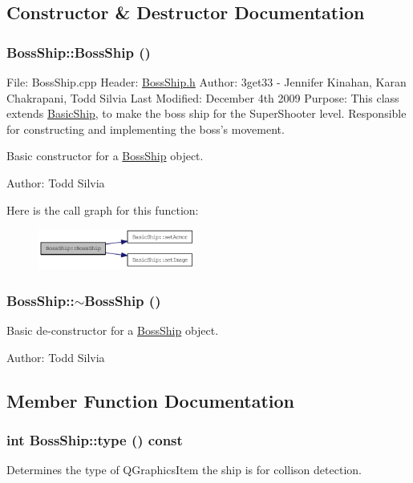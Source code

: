 \subsection{Constructor \& Destructor Documentation}
\hypertarget{class_boss_ship_af7d62c20c5aa3de6435ef0e80351dfb6}{
\subsubsection[{BossShip}]{\setlength{\rightskip}{0pt plus 5cm}BossShip::BossShip ()}}
\label{class_boss_ship_af7d62c20c5aa3de6435ef0e80351dfb6}
File: BossShip.cpp Header: \hyperlink{_boss_ship_8h_source}{BossShip.h} Author: 3get33 -\/ Jennifer Kinahan, Karan Chakrapani, Todd Silvia Last Modified: December 4th 2009 Purpose: This class extends \hyperlink{class_basic_ship}{BasicShip}, to make the boss ship for the SuperShooter level. Responsible for constructing and implementing the boss's movement.

Basic constructor for a \hyperlink{class_boss_ship}{BossShip} object.

Author: Todd Silvia 

Here is the call graph for this function:\nopagebreak
\begin{figure}[H]
\begin{center}
\leavevmode
\includegraphics[width=146pt]{class_boss_ship_af7d62c20c5aa3de6435ef0e80351dfb6_cgraph}
\end{center}
\end{figure}
\hypertarget{class_boss_ship_ab3281544fda151089dea661331e57e59}{
\subsubsection[{$\sim$BossShip}]{\setlength{\rightskip}{0pt plus 5cm}BossShip::$\sim$BossShip ()}}
\label{class_boss_ship_ab3281544fda151089dea661331e57e59}
Basic de-\/constructor for a \hyperlink{class_boss_ship}{BossShip} object.

Author: Todd Silvia 

\subsection{Member Function Documentation}
\hypertarget{class_boss_ship_aa6e1eb6f89978d9608560c8bfacc4906}{
\subsubsection[{type}]{\setlength{\rightskip}{0pt plus 5cm}int BossShip::type () const}}
\label{class_boss_ship_aa6e1eb6f89978d9608560c8bfacc4906}
Determines the type of QGraphicsItem the ship is for collison detection.

